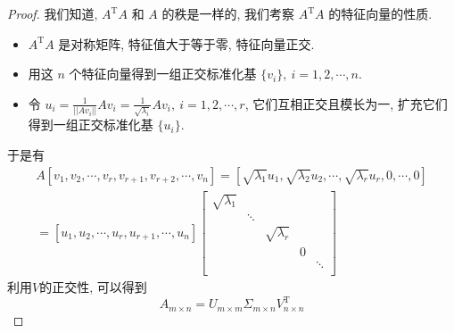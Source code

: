 \begin{proof}
  我们知道, $A^{\mathrm{T}} A$ 和 $A$ 的秩是一样的, 我们考察 $A^{\mathrm{T}}A$ 的特征向量的性质.

  \begin{itemize}
    \item $A^{\mathrm{T}}A$ 是对称矩阵, 特征值大于等于零, 特征向量正交.
    \item 用这 $n$ 个特征向量得到一组正交标准化基 $\{ v_i \}, \ i=1,2,\cdots,n$.
    \item 令 $ u_i = \frac{1}{||A v_i ||} A v_i = \frac{1}{\sqrt{\lambda_i}} A v_i,\ i=1,2,\cdots,r$, 它们互相正交且模长为一, 扩充它们得到一组正交标准化基 $\{ u_i \}$.
  \end{itemize}
  于是有
  \begin{equation}
    \begin{gathered}
      A \left[ v_1,v_2,\cdots,v_r, v_{r+1},v_{r+2},\cdots,v_n \right] = 
    \left[ \sqrt{\lambda_1} u_1, \sqrt{\lambda_2 }u_2,\cdots,\sqrt{\lambda_r}u_r, 0 , \cdots ,0\right] \\
    = \left[ u_1,u_2,\cdots,u_r, u_{r+1}, \cdots , u_n \right] \begin{bmatrix}
     \sqrt{\lambda_1} &  &  &  & \\
      & \ddots &  &  & \\
      &  & \sqrt{\lambda_r} &  & \\
      &  &  & 0 & \\
      &  &  &  & \ddots\\
    \end{bmatrix}
    \end{gathered}
  \end{equation}
  利用$V$的正交性, 可以得到
  \begin{equation}
    A_{m \times n} = U_{m \times  m} \Sigma_{m \times  n} V^{\mathrm{T}}_{n \times n}
  \end{equation}
\end{proof}